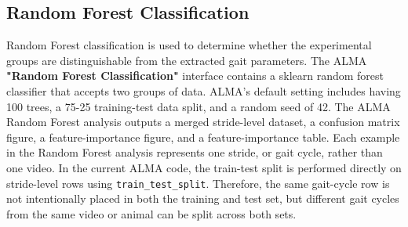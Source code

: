 \documentclass[11pt]{article}
\renewcommand{\[}{%
  \par\smallskip\noindent
  \begin{center}%
  \setlength{\fboxsep}{5pt}%
  \setlength{\fboxrule}{0.35pt}%
  \begin{lrbox}{\almaEquationBox}%
  $\displaystyle
}
\renewcommand{\]}{%
  $%
  \end{lrbox}%
  \fcolorbox{equationLine}{equationBack}{\usebox{\almaEquationBox}}%
  \end{center}%
  \smallskip\par
}
\begin{document}
\subsection{Random Forest Classification}

Random Forest classification is used to determine whether the experimental groups are distinguishable from the extracted gait
parameters. The ALMA \textbf{"Random Forest Classification"}  interface contains a sklearn random forest classifier that accepts two groups of data. ALMA's default setting includes having 100 trees, a 75-25 training-test data split, and a random seed of 42. The ALMA Random Forest analysis outputs a merged stride-level dataset, a
confusion matrix figure, a feature-importance figure, and a feature-importance
table. Each example in the Random Forest analysis represents one stride, or gait
cycle, rather than one video. In the current ALMA code, the train-test split is performed directly on stride-level rows using \texttt{train\_test\_split}. Therefore, the same gait-cycle row is not intentionally placed in both the training and test set, but different gait cycles from the same video or animal can be split across both sets.
\end{document}

